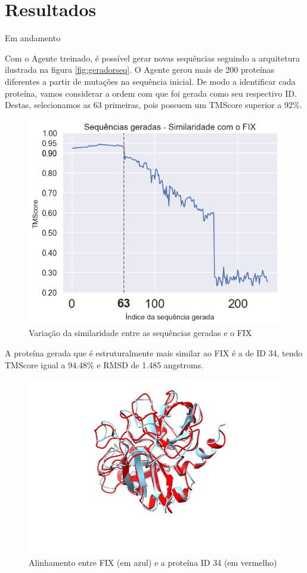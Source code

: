 \chapter{Resultados}

{\color{red} Em andamento}

Com o Agente treinado, é possível gerar novas sequências seguindo a arquitetura ilustrada na figura \ref{fig:geradorseq}. 
O Agente gerou mais de 200 proteínas diferentes a partir de mutações na sequência inicial. 
De modo a identificar cada proteína, vamos considerar a ordem com que foi gerada como seu respectivo ID.
Destas, selecionamos as 63 primeiras, pois possuem um TMScore superior a 92\%. 


\begin{figure}[H]
    \centering
    \includegraphics[width=.6\linewidth]{figuras/plot_tmscore_decreasing.png}    
    \caption{Variação da similaridade entre as sequências geradas e o FIX }
    \label{fig:tmscore_decreasing}
  \end{figure}


A proteína gerada que é estruturalmente mais similar ao FIX é a de ID 34,
tendo TMScore igual a 94.48\% e RMSD de 1.485 angstroms. 

\begin{figure}[H]
    \centering
    \includegraphics[width=.6\linewidth]{figuras/FIXvsID34.png}    
    \caption{Alinhamento entre FIX (em azul) e a proteína ID 34 (em vermelho)}
    \label{fig:FIX_vs_ID34}
\end{figure}


